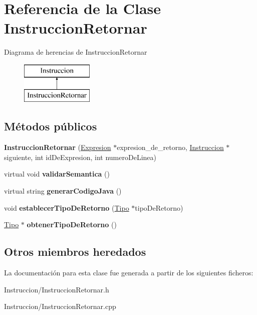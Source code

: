 \hypertarget{class_instruccion_retornar}{\section{Referencia de la Clase Instruccion\-Retornar}
\label{class_instruccion_retornar}
}
Diagrama de herencias de Instruccion\-Retornar\begin{figure}[H]
\begin{center}
\leavevmode
\includegraphics[height=2.000000cm]{class_instruccion_retornar}
\end{center}
\end{figure}
\subsection*{Métodos públicos}
\begin{DoxyCompactItemize}
\item 
\hypertarget{class_instruccion_retornar_a5dedcbb7284963865a14c6404ce611e6}{{\bfseries Instruccion\-Retornar} (\hyperlink{class_expresion}{Expresion} $\ast$expresion\-\_\-de\-\_\-retorno, \hyperlink{class_instruccion}{Instruccion} $\ast$siguiente, int id\-De\-Expresion, int numero\-De\-Linea)}\label{class_instruccion_retornar_a5dedcbb7284963865a14c6404ce611e6}

\item 
\hypertarget{class_instruccion_retornar_a851f2b2dbef7e7d26ff7e3c0d1838150}{virtual void {\bfseries validar\-Semantica} ()}\label{class_instruccion_retornar_a851f2b2dbef7e7d26ff7e3c0d1838150}

\item 
\hypertarget{class_instruccion_retornar_a61048d7238b2c5f285e75e506dd1a1ef}{virtual string {\bfseries generar\-Codigo\-Java} ()}\label{class_instruccion_retornar_a61048d7238b2c5f285e75e506dd1a1ef}

\item 
\hypertarget{class_instruccion_retornar_af805d72620a9db7a3fc749a2ba414cff}{void {\bfseries establecer\-Tipo\-De\-Retorno} (\hyperlink{class_tipo}{Tipo} $\ast$tipo\-De\-Retorno)}\label{class_instruccion_retornar_af805d72620a9db7a3fc749a2ba414cff}

\item 
\hypertarget{class_instruccion_retornar_ab6f78cf720f50134dca62f385d35c3ad}{\hyperlink{class_tipo}{Tipo} $\ast$ {\bfseries obtener\-Tipo\-De\-Retorno} ()}\label{class_instruccion_retornar_ab6f78cf720f50134dca62f385d35c3ad}

\end{DoxyCompactItemize}
\subsection*{Otros miembros heredados}


La documentación para esta clase fue generada a partir de los siguientes ficheros\-:\begin{DoxyCompactItemize}
\item 
Instruccion/Instruccion\-Retornar.\-h\item 
Instruccion/Instruccion\-Retornar.\-cpp\end{DoxyCompactItemize}
